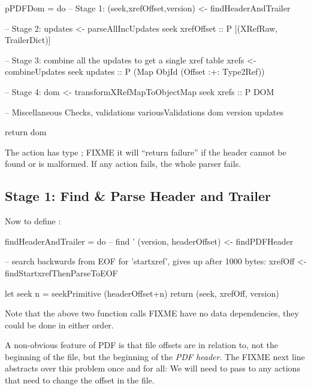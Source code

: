 \begin{code}
pPDFDom =
    do
    -- Stage 1:
    (seek,xrefOffset,version) <- findHeaderAndTrailer

    -- Stage 2:
    updates <- parseAllIncUpdates seek xrefOffset
               :: P [(XRefRaw, TrailerDict)]

    -- Stage 3: combine all the updates to get a single xref table
    xrefs <- combineUpdates seek updates
             :: P (Map ObjId (Offset :+: Type2Ref))

    -- Stage 4:
    dom <- transformXRefMapToObjectMap seek xrefs
           :: P DOM
    
    -- Miscellaneous Checks, validations
    variousValidations dom version updates

    return dom
\end{code}


The action  has type ; FIXME
it will ``return failure'' if the header cannot be found or is malformed.
If any action fails, the whole parser fails.

\subsection{Stage 1: Find \& Parse Header and Trailer}

Now to define :
\begin{code}
findHeaderAndTrailer =
    do
    -- find '%
    (version, headerOffset) <- findPDFHeader

    -- search backwards from EOF for 'startxref', gives up after 1000 bytes:
    xrefOff <- findStartxrefThenParseToEOF
    
    let seek n = seekPrimitive (headerOffset+n)
    return (seek, xrefOff, version)
    
\end{code}

Note that the above two function calls FIXME have no data dependencies, they
could be done in either order.

A non-obvious feature of PDF is that file offsets are in relation to, not the
beginning of the file, but the beginning of the \emph{PDF header}.
%
The FIXME next line abstracts over this problem once and for all:
We will need to pass  to any actions that need to change
the offset in the file.

